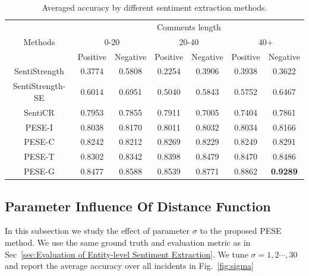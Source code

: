 \documentclass[runningheads]{llncs}
\begin{document}
\vspace{-0.6cm}
\begin{table}
\begin{center}
\begin{tabular}{|c|c|c|c|c|c|c|}
\hline
\multirow{3}{*}{Methods}             & \multicolumn{6}{c|}{Comments length}                                                \\ \cline{2-7} 
                                     & \multicolumn{2}{c|}{0-20} & \multicolumn{2}{c|}{20-40} & \multicolumn{2}{c|}{40+} \\ \cline{2-7} 
                                     & Positive    & Negative    & Positive     & Negative    & Positive     & Negative    \\ \hline
SentiStrength                        & 0.3774      & 0.5808      & 0.2254       & 0.3906      & 0.3938       & 0.3622      \\ \hline
SentiStrength-SE                     & 0.6014      & 0.6951      & 0.5040       & 0.5843      & 0.5752       & 0.6467      \\ \hline
SentiCR                              & 0.7953      & 0.7855      & 0.7911       & 0.7005      & 0.7404       & 0.7861      \\ \hline
 PESE-I                      & 0.8038      & 0.8170      & 0.8011       & 0.8032      & 0.8034       & 0.8166      \\ \hline
PESE-C                      & 0.8242      & 0.8212      & 0.8269       & 0.8229      & 0.8249       & 0.8291     \\ \hline
PESE-T                    & 0.8302      & 0.8342      & 0.8398      & 0.8479      & 0.8470       & 0.8486      \\ \hline
PESE-G                      & 0.8477      & 0.8588      & 0.8539       & 0.8771      & 0.8862       & \textbf{0.9289}      \\ \hline
\end{tabular}
\caption{Averaged accuracy by different sentiment extraction methods.}\label{table:sentiment classification}
\end{center}
\end{table}



\vspace{-1.5cm}
\subsection{Parameter Influence Of Distance Function}
In this subsection we study the effect of parameter $\sigma$ to the proposed PESE method. We use the same ground truth and evaluation metric as in Sec~\ref{sec:Evaluation of Entity-level Sentiment Extraction}. We tune $\sigma=1,2\cdots,30$ and report the average accuracy over all incidents in Fig.~\ref{fig:sigma}
\end{document}
